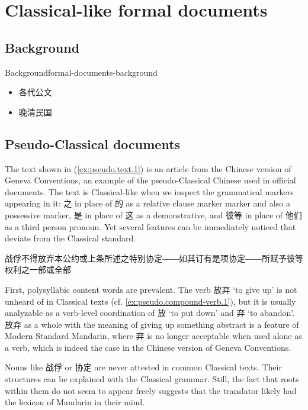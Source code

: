 \documentclass[UTF8, a4paper, oneside, scheme=plain, 12pt]{ctexrep}
\newcommand{\translate}[1]{`#1'}
\begin{document}
\section{Classical-like formal documents}

\subsection{Background}

\begin{todobox}{Background}{formal-documents-background}
    \begin{itemize}
        \item 各代公文
        \item 晚清民国
    \end{itemize}
\end{todobox}

\subsection{Pseudo-Classical documents}\label{sec:genres.pseudo}

The text shown in (\ref{ex:pseudo.text.1}) is an article from the Chinese version of Geneva Conventions, an example of the pseudo-Classical Chinese used in official documents.
The text is Classical-like when we inspect the grammatical markers appearing in it:
之 in place of 的 as a relative clause marker marker and also a possessive marker,
是 in place of 这 as a demonstrative,
and 彼等 in place of 他们 as a third person pronoun.
Yet several features can be immediately noticed that deviate from the Classical standard.

\begin{exe}
    \ex\label{ex:pseudo.text.1} 战俘不得放弃本公约或上条所述之特别协定――如其订有是项协定――所赋予彼等权利之一部或全部
\end{exe}

First, polysyllabic content words are prevalent.
The verb 放弃 \translate{to give up} is not unheard of in Classical texts (cf. \ref{ex:pseudo.compound-verb.1}),
but it is usually analyzable as a verb-level coordination of 放 \translate{to put down} and 弃 \translate{to abandon}.
放弃 as a whole with the meaning of giving up something abstract is a feature of Modern Standard Mandarin,
where 弃 is no longer acceptable when used alone as a verb,
which is indeed the case in the Chinese version of Geneva Conventions.

Nouns like 战俘 or 协定 are never attested in common Classical texts.
Their structures can be explained with the Classical grammar.
Still, the fact that roots within them do not seem to appear freely suggests that the translator likely had the lexicon of Mandarin in their mind.
\end{document}
